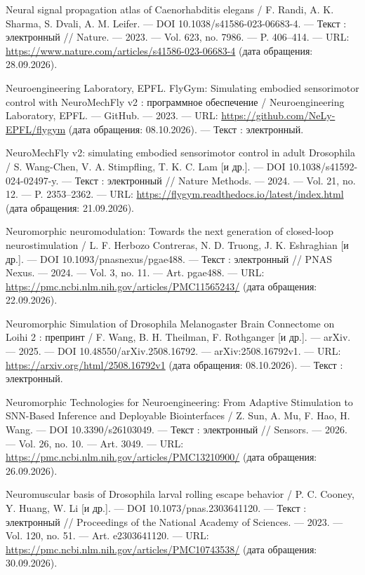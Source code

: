 \begin{list}{}{\setlength{\leftmargin}{10mm}\setlength{\labelwidth}{8mm}\setlength{\labelsep}{2mm}\setlength{\itemsep}{0pt}\setlength{\parsep}{0pt}\setlength{\topsep}{0pt}}
\item[199.] Neural signal propagation atlas of Caenorhabditis elegans / F. Randi, A. K. Sharma, S. Dvali, A. M. Leifer. — DOI 10.1038/s41586-023-06683-4. — Текст : электронный // Nature. — 2023. — Vol. 623, no. 7986. — P. 406–414. — URL: \url{https://www.nature.com/articles/s41586-023-06683-4} (дата обращения: 28.09.2026).
\item[200.] Neuroengineering Laboratory, EPFL. FlyGym: Simulating embodied sensorimotor control with NeuroMechFly v2 : программное обеспечение / Neuroengineering Laboratory, EPFL. — GitHub. — 2023. — URL: \url{https://github.com/NeLy-EPFL/flygym} (дата обращения: 08.10.2026). — Текст : электронный.
\item[201.] NeuroMechFly v2: simulating embodied sensorimotor control in adult Drosophila / S. Wang-Chen, V. A. Stimpfling, T. K. C. Lam [и др.]. — DOI 10.1038/s41592-024-02497-y. — Текст : электронный // Nature Methods. — 2024. — Vol. 21, no. 12. — P. 2353–2362. — URL: \url{https://flygym.readthedocs.io/latest/index.html} (дата обращения: 21.09.2026).
\item[202.] Neuromorphic neuromodulation: Towards the next generation of closed-loop neurostimulation / L. F. Herbozo Contreras, N. D. Truong, J. K. Eshraghian [и др.]. — DOI 10.1093/pnasnexus/pgae488. — Текст : электронный // PNAS Nexus. — 2024. — Vol. 3, no. 11. — Art. pgae488. — URL: \url{https://pmc.ncbi.nlm.nih.gov/articles/PMC11565243/} (дата обращения: 22.09.2026).
\item[203.] Neuromorphic Simulation of Drosophila Melanogaster Brain Connectome on Loihi 2 : препринт / F. Wang, B. H. Theilman, F. Rothganger [и др.]. — arXiv. — 2025. — DOI 10.48550/arXiv.2508.16792. — arXiv:2508.16792v1. — URL: \url{https://arxiv.org/html/2508.16792v1} (дата обращения: 08.10.2026). — Текст : электронный.
\item[204.] Neuromorphic Technologies for Neuroengineering: From Adaptive Stimulation to SNN-Based Inference and Deployable Biointerfaces / Z. Sun, A. Mu, F. Hao, H. Wang. — DOI 10.3390/s26103049. — Текст : электронный // Sensors. — 2026. — Vol. 26, no. 10. — Art. 3049. — URL: \url{https://pmc.ncbi.nlm.nih.gov/articles/PMC13210900/} (дата обращения: 26.09.2026).
\item[205.] Neuromuscular basis of Drosophila larval rolling escape behavior / P. C. Cooney, Y. Huang, W. Li [и др.]. — DOI 10.1073/pnas.2303641120. — Текст : электронный // Proceedings of the National Academy of Sciences. — 2023. — Vol. 120, no. 51. — Art. e2303641120. — URL: \url{https://pmc.ncbi.nlm.nih.gov/articles/PMC10743538/} (дата обращения: 30.09.2026).

\end{list}
